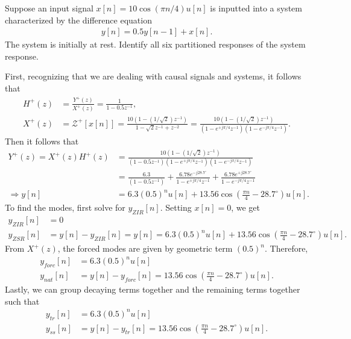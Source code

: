 \documentclass{report}
\begin{document}
\begin{example}
    Suppose an input signal $x[n]=10\cos(\pi n/4)u[n]$ is inputted into a system characterized by the difference equation 
    \begin{align*}
        y[n] = 0.5y[n-1] + x[n].
    \end{align*}
    The system is initially at rest. Identify all six partitioned responses of the system response.
\end{example}
\begin{solution}
    First, recognizing that we are dealing with causal signals and systems, it follows that 
    \begin{align*}
        H^+(z) &= \frac{Y^+(z)}{X^+(z)} = \frac{1}{1-0.5z^{-1}}, \\
        X^+(z) &= \mathcal{Z}^+[x[n]] = \frac{10(1-(1/\sqrt{2})z^{-1})}{1-\sqrt{2}z^{-1}+z^{-2}} = \frac{10(1-(1/\sqrt{2})z^{-1})}{(1-e^{+j\pi/4}z^{-1})(1-e^{-j\pi/4}z^{-1})}.
    \end{align*}
    Then it follows that 
    \begin{align*}
        Y^+(z) = X^+(z)H^+(z) &= \frac{10(1-(1/\sqrt{2})z^{-1})}{(1-0.5z^{-1})(1-e^{+j\pi/4}z^{-1})(1-e^{-j\pi/4}z^{-1})} \\
        &= \frac{6.3}{(1-0.5z^{-1})} + \frac{6.78e^{-j28.7^{\circ}}}{1-e^{+j\pi/4}z^{-1}} + \frac{6.78e^{+j28.7^{\circ}}}{1-e^{-j\pi/4}z^{-1}} \\
        \Longrightarrow y[n] &= 6.3(0.5)^n u[n] + 13.56\cos\left(\frac{\pi n}{4}-28.7^{\circ}\right)u[n].
    \end{align*}
    To find the modes, first solve for $y_{ZIR}[n]$. Setting $x[n]=0$, we get 
    \begin{align*}
        y_{ZIR}[n] &= 0 \\
        y_{ZSR}[n] &= y[n] - y_{ZIR}[n] = y[n] = 6.3(0.5)^n u[n] + 13.56\cos\left(\frac{\pi n}{4}-28.7^{\circ}\right)u[n].
    \end{align*}
    From $X^+(z)$, the forced modes are given by geometric term $(0.5)^n$. Therefore,
    \begin{align*}
        y_{forc}[n] &= 6.3(0.5)^n u[n] \\
        y_{nat}[n] &= y[n] - y_{forc}[n] = 13.56\cos\left(\frac{\pi n}{4}-28.7^{\circ}\right)u[n].
    \end{align*}
    Lastly, we can group decaying terms together and the remaining terms together such that
    \begin{align*}
        y_{tr}[n] &= 6.3(0.5)^n u[n] \\
        y_{ss}[n] &= y[n] - y_{tr}[n] = 13.56\cos\left(\frac{\pi n}{4}-28.7^{\circ}\right)u[n].
    \end{align*}
\end{solution}
\end{document}
